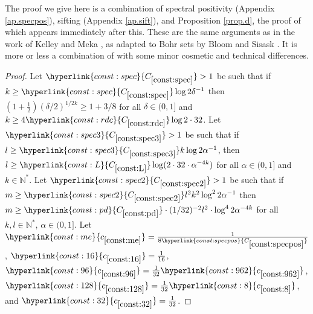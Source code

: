 \documentclass[12pt,reqno]{amsart}
\providecommand{\N}{\mathbb{N}}
\numberwithin{equation}{section}
\newcommand{\refconstlittle}[1]{%
    \hyperlink{const:#1}{c_{\ref{const:#1}}}%
}
\newcommand{\refconstbig}[1]{%
    \hyperlink{const:#1}{C_{\ref{const:#1}}}%
}
\begin{document}
The proof we give here is a combination of spectral positivity (Appendix \ref{ap.specpos}), sifting (Appendix \ref{ap.sift}), and Proposition \ref{prop.d}, the proof of which appears immediately after this. These are the same arguments as in the work of Kelley and Meka \cite{kelmek::0}, as adapted to Bohr sets by Bloom and Sisask \cite{Bloom:2023aa}. It is more or less a combination of \cite[Propositions 15, 18, \& 20]{Bloom:2023aa} with some minor cosmetic and technical differences.
\begin{proof}
Let $\refconstbig{spec}>1$ be such that if $k \geq \refconstbig{spec}\log 2\delta^{-1}$ then $\left(1+\frac{1}{2}\right)(\delta/2)^{1/2k} \geq 1+3/8$ for all $\delta \in (0,1]$ and $k \geq 4\refconstbig{rdc}\log 2\cdot 32$. Let $\refconstbig{spec3}>1$ be such that if $l \geq \refconstbig{spec3}k \log 2\alpha^{-1}$, then $l \geq \refconstbig{L}\log  (2 \cdot 32 \cdot \alpha^{-4k})$ for all $\alpha \in (0,1]$ and $k \in \N^*$.  Let $\refconstbig{spec2}>1$ be such that if $m \geq \refconstbig{spec2}l^2k^2\log^22\alpha^{-1}$ then $m \geq \refconstbig{pd}\cdot (1/32)^{-2}l^2\cdot \log^4 2\alpha^{-4k}$ for all $k,l\in \N^*$, $\alpha \in (0,1]$. Let $\refconstlittle{me}=\frac{1}{8\refconstbig{specpos}}$, $\refconstlittle{16}=\frac{1}{16}$, $\refconstlittle{96}=\frac{1}{32}\refconstlittle{962}$, $\refconstlittle{128}=\frac{1}{32}\refconstlittle{8}$, and $\refconstlittle{32}=\frac{1}{32}$.


\end{proof}
\end{document}
